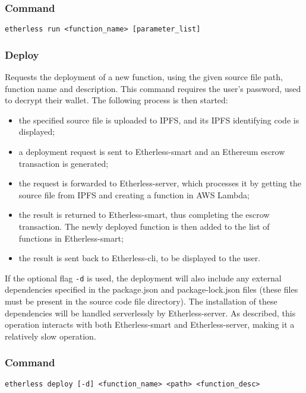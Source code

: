 	\subsubsection*{Command}
	\texttt{etherless run <function\_name> [parameter\_list]}
	\subsubsection{Deploy}
	Requests the deployment of a new function, using the given source file path, function name and description. This command requires the user's password, used to decrypt their wallet. The following process is then started:
	\begin{itemize}
		\item the specified source file is uploaded to IPFS, and its IPFS identifying code is displayed;
		\item a deployment request is sent to Etherless-smart and an Ethereum escrow transaction is generated;
		\item the request is forwarded to Etherless-server, which processes it by getting the source file from IPFS and creating a function in AWS Lambda;
		\item the result is returned to Etherless-smart, thus completing the escrow transaction. The newly deployed function is then added to the list of functions in Etherless-smart;
		\item the result is sent back to Etherless-cli, to be displayed to the user.
	\end{itemize}
	If the optional flag \texttt{-d} is used, the deployment will also include any external dependencies specified in the package.json and package-lock.json files (these files must be present in the source code file directory). The installation of these dependencies will be handled serverlessly by Etherless-server.
	As described, this operation interacts with both Etherless-smart and Etherless-server, making it a relatively slow operation.
	\subsubsection*{Command}
	\texttt{etherless deploy [-d] <function\_name> <path>  <function\_desc>}
